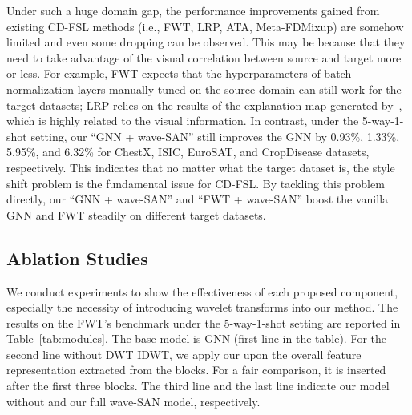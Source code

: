 \documentclass{article}
\begin{document}
Under such a huge domain gap, the performance improvements gained from existing CD-FSL methods (i.e., FWT, LRP, ATA, Meta-FDMixup) 
are somehow limited and even some dropping can be observed. This may be because that they need to take advantage of the visual correlation between source and target more or less. For example, FWT expects that the hyperparameters of batch normalization layers manually tuned on the source domain can still work for the target datasets; LRP relies on the results of the explanation map generated by~\cite{bach2015pixel}, which is highly related to the visual information. 
In contrast, under the 5-way-1-shot setting, our ``GNN + wave-SAN'' still improves the GNN by 0.93\%, 1.33\%, 5.95\%, and 6.32\% for ChestX, ISIC, EuroSAT, and CropDisease datasets, respectively. This indicates that no matter what the target dataset is, the style shift problem is the fundamental issue for CD-FSL. By tackling this problem directly, our ``GNN + wave-SAN'' and ``FWT + wave-SAN'' boost the vanilla GNN and FWT steadily on different target datasets.



\subsection{Ablation Studies}
We conduct experiments to show the effectiveness of each proposed component, especially the necessity of introducing wavelet transforms into our method. The results on the FWT's benchmark under the 5-way-1-shot setting are reported in Table~\ref{tab:modules}. The base model is GNN (first line in the table). For the second line without DWT  IDWT, we apply our  upon the overall feature representation extracted from the blocks. For a fair comparison, it is inserted after the first three blocks. The third line and the last line indicate our model without  and our full wave-SAN model, respectively.
\end{document}
